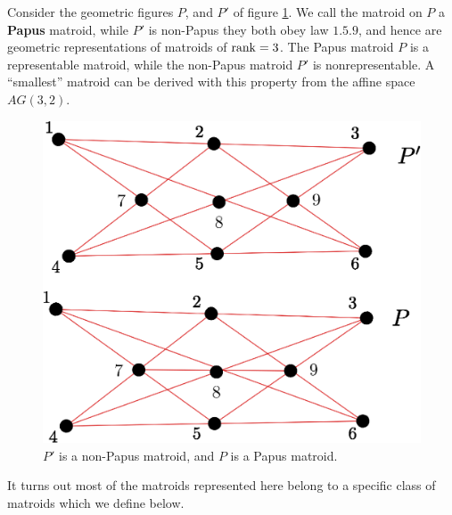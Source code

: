 \begin{example}\label{1.20}
    Consider the geometric figures $P$, and $P'$ of figure \ref{fig_1.15}. We
    call the matroid on $P$ a  \textbf{Papus} matroid, while $P'$ is
    non-Papus they both obey law  $1.5.9$, and hence are geometric
    representations of  matroids of $\operatorname{rank}=3$. The Papus matroid $P$ is a
    representable matroid, while the non-Papus matroid  $P'$ is
    nonrepresentable. A ``smallest'' matroid can be derived with this property
    from the affine space $AG(3,2)$.
    \begin{figure}[h]
        \centering
        \includegraphics[scale=0.8]{Figures/Chapter1/paupus_nonpaupus.eps}
        \caption{$P'$ is a non-Papus matroid, and $P$ is a Papus matroid.}
        \label{fig_1.15}
    \end{figure}
\end{example}

It turns out most of the matroids represented here belong to a specific class of
matroids which we define below.

